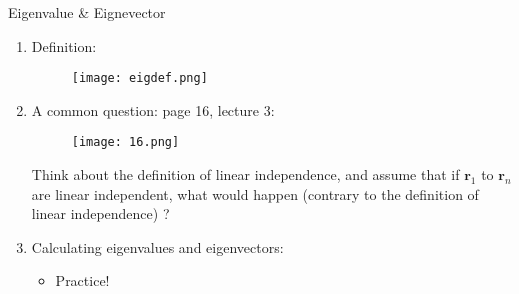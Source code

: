 \documentclass{beamer}
\begin{document}
\begin{frame}[allowframebreaks]{Eigenvalue \& Eignevector}
	\begin{enumerate}
		\item Definition:
		\begin{figure}[H]
			\centering
			\texttt{[image: eigdef.png]}
		\end{figure}
		
		\item A common question: page 16, lecture 3:
		\begin{figure}[H]
			\centering
			\texttt{[image: 16.png]}
		\end{figure}
		Think about the definition of \alert{linear independence}, and assume that if $\mathbf{r}_1$ to $\mathbf{r}_n$ are linear independent, what would happen (contrary to the definition of linear independence) ?
		
		\item Calculating eigenvalues and eigenvectors:
		\begin{itemize}
			\item Practice!
		\end{itemize}
	\end{enumerate}

\end{frame}
\end{document}
